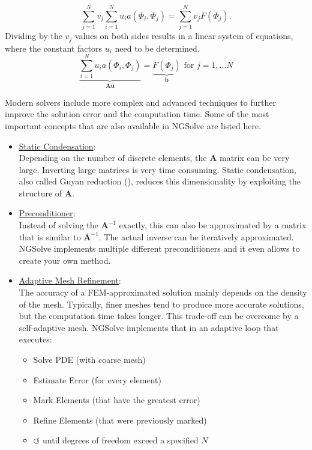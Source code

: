 \documentclass[./\jobname.tex]{subfiles}
\begin{document}
\begin{enumerate}
		  \begin{equation}
		  \sum_{j=1}^{N} v_j \sum_{i=1}^{N} u_i a(\Phi_i, \Phi_j) = \sum_{j=1}^{N} v_j F(\Phi_j).
		  \end{equation} 
		  Dividing by the $v_j$ values on both sides results in a linear system of equations, where the constant factors $u_i$ need to be determined.  
		  \begin{equation}
		  \label{eq:linear_system_of_equations}
		  \underbrace{\sum_{i=1}^{N} u_i a(\Phi_i, \Phi_j)}_{\mathbf{A u}} = \underbrace{F(\Phi_j)}_{\mathbf{b}} \text{ for $j=1,...N$}
		  \end{equation}
\end{enumerate}

Modern solvers include more complex and advanced techniques to further improve the solution error and the computation time. Some of the most important concepts that are also available in NGSolve are listed here. 

\begin{itemize}
	\item \underline{Static Condensation}: \\
		  Depending on the number of discrete elements, the $\mathbf{A}$ matrix can be very large. Inverting large matrices is very time consuming. Static condensation, also called Guyan reduction (\cite{guyan_reduction_1965}), reduces this dimensionality by exploiting the structure of $\mathbf{A}$. 
	\item \underline{Preconditioner}: \\
		  Instead of solving the $\mathbf{A}^{-1}$ exactly, this can also be approximated by a matrix that is similar to $\mathbf{A}^{-1}$. The actual inverse can be iteratively approximated. NGSolve implements multiple different preconditioners and it even allows to create your own method. 
	\item \underline{Adaptive Mesh Refinement}: \\
		The accuracy of a FEM-approximated solution mainly depends on the density of the mesh. Typically, finer meshes tend to produce more accurate solutions, but the computation time takes longer. This trade-off can be overcome by a self-adaptive mesh. NGSolve implements that in an adaptive loop that executes: 
		\begin{itemize}
			\item Solve PDE (with coarse mesh)
			\item Estimate Error (for every element)
			\item Mark Elements (that have the greatest error)
			\item Refine Elements (that were previously marked)
			\item $\mathbf{\circlearrowleft}$  until degrees of freedom exceed a specified $N$
		\end{itemize}
\end{itemize}
\end{document}
